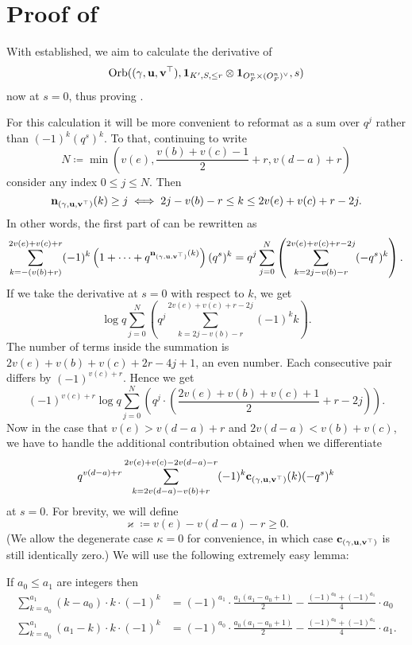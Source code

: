 \section{Proof of }
With  established, we aim to calculate the derivative of
\[ \operatorname{Orb}({(\gamma, \mathbf u, \mathbf v^\top)}, \mathbf{1}_{K', S, \le r} \otimes \mathbf{1}_{O_F^n \times (O_F^n)^\vee}, s) \]
now at $s = 0$, thus proving .

For this calculation it will be more convenient to reformat 
as a sum over $q^j$ rather than $(-1)^k (q^s)^k$.
To that, continuing to write
\[ N \coloneqq \min \left(
    v(e), \frac{v(b)+v(c)-1}{2} + r,
    v(d-a) + r \right) \]
consider any index $0 \le j \le N$.
Then
\[ \mathbf n_{(\gamma, \mathbf u, \mathbf v^\top)}(k) \ge j \iff 2j - v(b) - r \le k \le 2v(e)+v(c)+r-2j. \]
In other words, the first part of  can be rewritten as
\[ \sum_{k = -(v(b)+r)}^{2v(e)+v(c)+r} (-1)^k
  \left( 1 + \dots + q^{\mathbf n_{(\gamma, \mathbf u, \mathbf v^\top)}(k)} \right) (q^s)^k
  = q^j \sum_{j=0}^N \left( \sum_{k=2j-v(b)-r}^{2v(e)+v(c)+r-2j} (-q^s)^k \right). \]
If we take the derivative at $s = 0$ with respect to $k$, we get
\[ \log q \sum_{j=0}^N \left( q^j \sum_{k=2j-v(b)-r}^{2v(e)+v(c)+r-2j} (-1)^k k \right). \]
The number of terms inside the summation is
$2v(e)+v(b)+v(c)+2r-4j+1$, an even number.
Each consecutive pair differs by $(-1)^{v(c)+r}$.
Hence we get
\[ (-1)^{v(c)+r} \log q \sum_{j=0}^N \left( q^j
  \cdot \left( \frac{2v(e)+v(b)+v(c)+1}{2} + r - 2j \right) \right). \]
Now in the case that $v(e) > v(d-a) + r$ and $2v(d-a) < v(b) + v(c)$,
we have to handle the additional contribution obtained when we differentiate
\begin{equation}
  q^{v(d-a)+r}
  \sum_{k = 2v(d-a)-v(b)+r}^{2v(e)+v(c)-2v(d-a)-r} (-1)^k \mathbf c_{(\gamma, \mathbf u, \mathbf v^\top)}(k) (-q^s)^k
  \label{eq:top_derivative}
\end{equation}
at $s = 0$.
For brevity, we will define
\[ \varkappa \coloneqq v(e) - v(d-a) - r \ge 0. \]
(We allow the degenerate case $\kappa = 0$ for convenience,
in which case $\mathbf c_{(\gamma, \mathbf u, \mathbf v^\top)}$ is still identically zero.)
We will use the following extremely easy lemma:
\begin{lemma}
  If $a_0 \le a_1$ are integers then
  \begin{align*}
    \sum_{k=a_0}^{a_1} (k-a_0) \cdot k \cdot (-1)^k
    &= (-1)^{a_1} \cdot \frac{a_1(a_1-a_0+1)}{2} - \frac{(-1)^{a_0} + (-1)^{a_1}}{4} \cdot a_0 \\
    \sum_{k=a_0}^{a_1} (a_1-k) \cdot k \cdot (-1)^k
    &= (-1)^{a_0} \cdot \frac{a_0(a_1-a_0+1)}{2} - \frac{(-1)^{a_0} + (-1)^{a_1}}{4} \cdot a_1.
  \end{align*}
\end{lemma}
